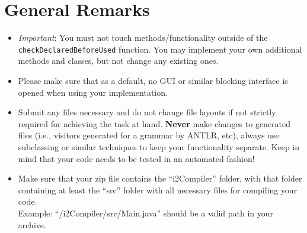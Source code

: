 \documentclass[a4paper]{article}
\begin{document}

\section*{General Remarks}
\begin{itemize}
    \item \emph{Important}: You must not touch methods/functionality outside of the \texttt{checkDeclaredBeforeUsed} function.
        You may implement your own additional methods and classes, but not change any existing ones.
    \item Please make sure that as a default, no GUI or similar blocking interface is opened when using your implementation.
    \item Submit any files necessary and do not change file layouts if not strictly required for achieving the task at hand. \textbf{Never} make changes to generated files (i.e., visitors generated for a grammar by ANTLR, etc), always use subclassing or similar techniques to keep your functionality separate. Keep in mind that your code needs to be tested in an automated fashion!
    \item Make sure that your zip file contains the ``i2Compiler'' folder, with that folder containing at least the ``src'' folder with all necessary files for compiling your code.\\Example: ``/i2Compiler/src/Main.java'' should be a valid path in your archive.

\end{itemize}
\end{document}
